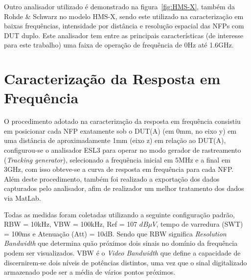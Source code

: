 Outro analisador utilizado é demonstrado na figura~\ref{fig:HMS-X}, também da Rohde \& Schwarz no modelo HMS-X, sendo este utilizado na caracterização em baixas frequências, intensidade por distância e resolução espacial das NFPs com DUT duplo. Este analisador tem entre as principais características (de interesse para este trabalho) uma faixa de operação de frequência de 0Hz até 1.6GHz.

\section{Caracterização da Resposta em Frequência}
O procedimento adotado na caracterização da resposta em frequência consistiu em posicionar cada NFP exatamente sob o DUT(A) (em 0mm, no eixo y) em uma distância de aproximadamente 1mm (eixo z) em relação ao DUT(A), configurou-se o analisador ESL3 para operar no modo gerador de rastreamento (\textit{Tracking generator}), selecionado a frequência inicial em 5MHz e a final em 3GHz, com isso obteve-se a curva de resposta em frequência para cada NFP. Além deste procedimento, também foi realizado a exportação dos dados capturados pelo analisador, afim de realizador um melhor tratamento dos dados via MatLab.

Todas as medidas foram coletadas utilizando a seguinte configuração padrão, RBW = 10kHz, VBW = 100kHz, Ref = 107 $dB \mu V$, tempo de varredura (SWT) = 100ms e Atenuação (Att) = 10dB. Sendo que RBW significa \textit{Resolution Bandwidth} que determina quão próximos dois sinais no domínio da frequência podem ser visualizados. VBW é o \textit{Video Bandwidth} que define a capacidade de discernirem-se dois níveis de potências distintos, uma vez que o sinal digitalizado armazenado pode ser a média de vários pontos próximos.


% 
% 
% 

